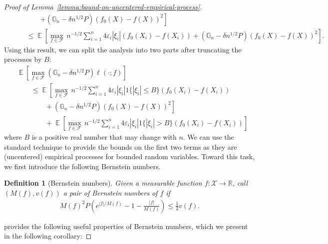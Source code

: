 \documentclass[12pt]{article}
\DeclareMathOperator*{\E}{\mathbb{E}}
\newtheorem{definition}[theorem]{Definition}
\begin{document}
\begin{appendices}
\begin{proof}[Proof of Lemma~\ref{lemma:bound-on-uncentered-empirical-process}]
\begin{align}
    &\qquad\qquad\left. + \left(\mathbb{G}_n -\delta n^{1/2} P\right)(f_0(X)-f(X))^2\right]\nonumber\nonumber\\
    &\qquad \le  \E\left[\max_{f\in\mathcal{F}}\,n^{-1/2}\sum_{i=1}^n 4\varepsilon_i|\xi_i| (f_0(X_i)-  f(X_i))+\left(\mathbb{G}_n -\delta n^{1/2} P\right)(f_0(X)-f(X))^2\right].\nonumber
\end{align}
Using this result, we can split the analysis into two parts after truncating the processes by $B$:
\begin{align}
	&\E\left[\max_{f \in \mathcal{F}}\left(\mathbb{G}_n -\delta n^{1/2} P\right)\ell(\cdot; f)\right]\nonumber\\
&\qquad \le \E\left[\max_{f\in\mathcal{F}}\,n^{-1/2}\sum_{i=1}^n 4\varepsilon_i|\xi_i|1\{|\xi_i| \le B\} (f_0(X_i)-  f(X_i))\right.\nonumber\\
&\left.\qquad\qquad +\left(\mathbb{G}_n -\delta n^{1/2} P\right)(f_0(X)-f(X))^2\right]\nonumber\\
&\qquad \qquad + \E\left[\max_{f\in\mathcal{F}}\,n^{-1/2}\sum_{i=1}^n 4\varepsilon_i|\xi_i|1\{|\xi_i| > B\} (f_0(X_i)-  f(X_i))\right]\label{term2}
\end{align}
where $B$ is a positive real number that may change with $n$. We can use the standard technique to provide the bounds on the first two terms as they are (uncentered) empirical processes for bounded random variables. Toward this task, we first introduce the following Bernstein numbers. 
\begin{definition}[Bernstein numbers]
	Given a measurable function $f: \mathcal{X} \rightarrow \mathbb{R}$, call $(M(f), v(f))$ a pair of Bernstein numbers of $f$ if
	\begin{align}\nonumber
		M(f)^2 P\left(e^{|f| / M(f)}-1-\frac{|f|}{M(f)}\right) \leq \frac{1}{2} v(f).
	\end{align}
\end{definition}
\cite[Section 8.1]{vaart2006oracle} provides the following useful properties of Bernstein numbers, which we present in the following corollary:


\end{proof}
\end{appendices}
\end{document}
